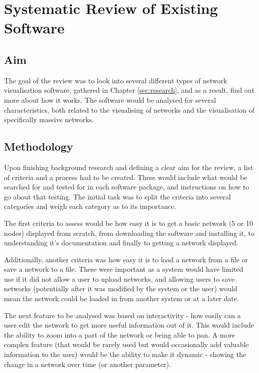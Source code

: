 \documentclass[../dissertation.tex]{subfiles}
\begin{document}
\chapter{Systematic Review of Existing Software}
\label{sec:systematic-review}

\section{Aim} 

The goal of the review was to look into several different types of network visualisation software, gathered in Chapter \ref{sec:research}, and as a result, find out more about how it works. The software would be analysed for several characteristics, both related to the visualising of networks and the visualisation of specifically massive networks.

\section{Methodology}
\label{sec:sys-rev-method}

Upon finishing background research and defining a clear aim for the review, a list of criteria and a process had to be created. These would include what would be searched for and tested for in each software package, and instructions on how to go about that testing. The initial task was to split the criteria into several categories and weigh each category as to its importance. 

The first criteria to assess would be how easy it is to get a basic network (5 or 10 nodes) displayed from scratch, from downloading the software and installing it, to understanding it's documentation and finally to getting a network displayed.

Additionally, another criteria was how easy it is to load a network from a file or save a network to a file. These were important as a system would have limited use if it did not allow a user to upload networks, and allowing users to save networks (potentially after it was modified by the system or the user) would mean the network could be loaded in from another system or at a later date. 

The next feature to be analysed was based on interactivity - how easily can a user edit the network to get more useful information out of it. This would include the ability to zoom into a part of the network or being able to pan. A more complex feature (that would be rarely used but would occasionally add valuable information to the user) would be the ability to make it dynamic - showing the change in a network over time (or another parameter). 
\end{document}
